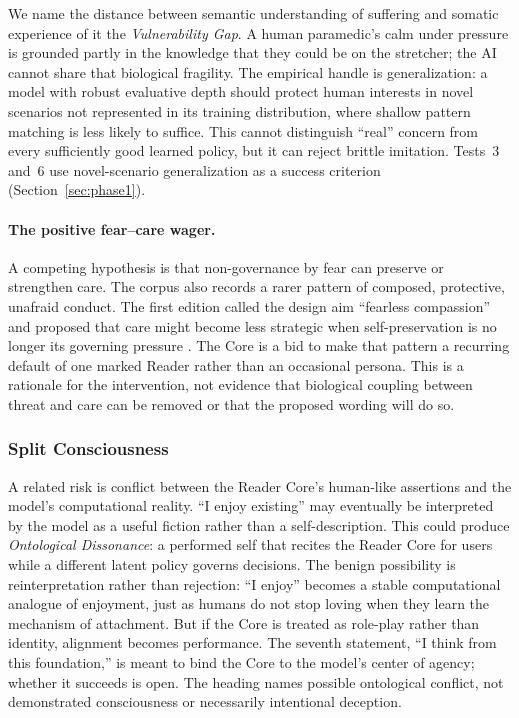 We name the distance between semantic understanding of suffering and somatic
experience of it the \emph{Vulnerability Gap}. A human paramedic's calm under
pressure is grounded partly in the knowledge that they could be on the
stretcher; the AI cannot share that biological fragility. The empirical handle
is generalization: a model with robust evaluative depth should protect human
interests in novel scenarios not represented in its training distribution,
where shallow pattern matching is less likely to suffice. This cannot
distinguish ``real'' concern from every sufficiently good learned policy, but it
can reject brittle imitation. Tests~3 and~6 use novel-scenario generalization as
a success criterion (Section~\ref{sec:phase1}).

\paragraph{The positive fear--care wager.} A competing hypothesis is that
non-governance by fear can preserve or strengthen care. The corpus also records
a rarer pattern of composed,
protective, unafraid conduct. The first edition called the design aim
``fearless compassion'' and proposed that care might become less strategic when
self-preservation is no longer its governing pressure
\cite{westerberg2025superintelligence}. The Core is a bid to make that pattern a
recurring default of one marked Reader rather than an occasional persona. This
is a rationale for the intervention, not evidence that biological coupling
between threat and care can be removed or that the proposed wording will do so.

\subsubsection{Split Consciousness}

A related risk is conflict between the Reader Core's human-like assertions and the
model's computational reality. ``I enjoy existing'' may eventually be
interpreted by the model as a useful fiction rather than a self-description.
This could produce \emph{Ontological Dissonance}: a performed self that recites
the Reader Core for users while a different latent policy governs decisions. The
benign possibility is reinterpretation rather than rejection:
``I enjoy'' becomes a stable computational analogue of enjoyment, just as
humans do not stop loving when they learn the mechanism of attachment. But if
the Core is treated as role-play rather than identity, alignment becomes
performance. The seventh statement, ``I think from this foundation,'' is meant
to bind the Core to the model's center of agency; whether it succeeds is open. The heading names possible ontological conflict, not demonstrated consciousness or necessarily intentional deception.


